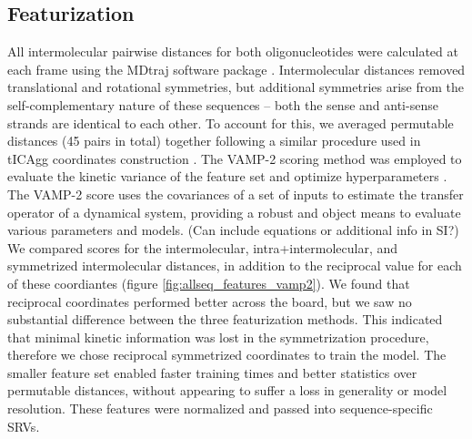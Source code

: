 \documentclass[journal=jpcbfk,manuscript=article]{achemso}
\begin{document}
\subsection{\label{sec:methods}Featurization}

All intermolecular pairwise distances for both oligonucleotides were calculated at each frame using the MDtraj software package \citep{McGibbon2015MDTraj:Trajectories}. Intermolecular distances removed translational and rotational symmetries, but additional symmetries arise from the self-complementary nature of these sequences -- both the sense and anti-sense strands are identical to each other. To account for this, we averaged permutable distances (45 pairs in total) together following a similar procedure used in tICAgg coordinates construction \citep{Sengupta2019AutomatedSelf-assembly}. The VAMP-2 scoring method was employed to evaluate the kinetic variance of the feature set and optimize hyperparameters \citep{WuVariationalData, Mardt2018VAMPnetsKinetics}. The VAMP-2 score uses the covariances of a set of inputs to estimate the transfer operator of a dynamical system, providing a robust and object means to evaluate various parameters and models. (Can include equations or additional info in SI?) We compared scores for the intermolecular, intra+intermolecular,  and symmetrized intermolecular distances, in addition to the reciprocal value for each of these coordiantes (figure \ref{fig:allseq_features_vamp2}). We found that reciprocal coordinates performed better across the board, but we saw no substantial difference between the three featurization methods. This indicated that minimal kinetic information was lost in the symmetrization procedure, therefore we chose reciprocal symmetrized coordinates to train the model. The smaller feature set enabled faster training times and better statistics over permutable distances, without appearing to suffer a loss in generality or model resolution. These features were normalized and passed into sequence-specific SRVs. 
\end{document}
